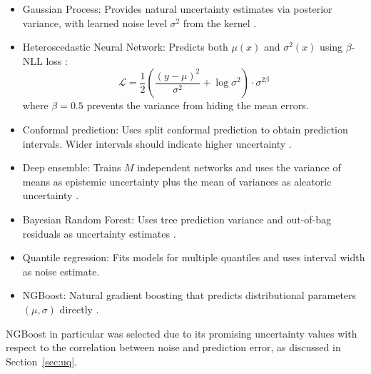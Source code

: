 \begin{itemize}
    \item Gaussian Process: Provides natural uncertainty estimates via posterior variance, with learned noise level $\sigma^2$ from the kernel \citep{gauche}.
    
    \item Heteroscedastic Neural Network: Predicts both $\mu(x)$ and $\sigma^2(x)$ using $\beta$-NLL loss \citep{Seitzer2022}:
    $$\mathcal{L} = \frac{1}{2}\left(\frac{(y - \mu)^2}{\sigma^2} + \log \sigma^2\right) \cdot \sigma^{2\beta}$$
    where $\beta = 0.5$ prevents the variance from hiding the mean errors.
    
    \item Conformal prediction: Uses split conformal prediction to obtain prediction intervals. Wider intervals should indicate higher uncertainty \citep{Shafer2008}.
    
    \item Deep ensemble: Trains $M$ independent networks and uses the variance of means as epistemic uncertainty plus the mean of variances as aleatoric uncertainty \citep{lakshminarayanan2017}.
    
    \item Bayesian Random Forest: Uses tree prediction variance and out-of-bag residuals as uncertainty estimates \citep{taddy2015}.
    
    \item Quantile regression: Fits models for multiple quantiles and uses interval width as noise estimate.
    
    \item NGBoost: Natural gradient boosting that predicts distributional parameters $(\mu, \sigma)$ directly \citep{Duan2020}.
\end{itemize}

NGBoost in particular was selected due to its promising uncertainty values with respect to the correlation between noise and prediction error, as discussed in Section~\ref{sec:uq}.  


